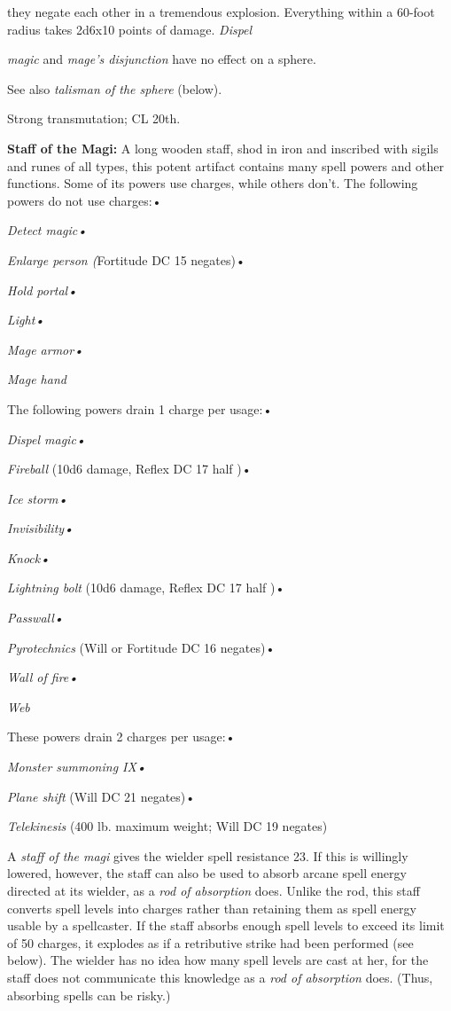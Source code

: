 \documentclass{article}
\begin{document}
they negate each other in a tremendous explosion. Everything within a 60-foot radius 
takes 2d6x10 points of damage. \textit{Dispel}

\textit{magic }and \textit{mage's disjunction }have no effect on a sphere.

See also \textit{talisman of the sphere }(below).

Strong transmutation; CL 20th.

\vspace{12pt}
\textbf{Staff of the Magi:} A long wooden staff, shod in iron and inscribed with 
sigils and runes of all types, this potent artifact contains many spell powers 
and other functions. Some of its powers use charges, while others don't. The following 
powers do not use charges:• 

\textit{Detect magic• }

\textit{Enlarge person (}Fortitude DC 15 negates)• 

\textit{Hold portal• }

\textit{Light• }

\textit{Mage armor• }

\textit{Mage hand}

The following powers drain 1 charge per usage:• 

\textit{Dispel magic• }

\textit{Fireball }(10d6 damage, Reflex DC 17 half )• 

\textit{Ice storm• }

\textit{Invisibility• }

\textit{Knock• }

\textit{Lightning bolt }(10d6 damage, Reflex DC 17 half )• 

\textit{Passwall• }

\textit{Pyrotechnics }(Will or Fortitude DC 16 negates)• 

\textit{Wall of fire• }

\textit{Web}

These powers drain 2 charges per usage:• 

\textit{Monster summoning IX• }

\textit{Plane shift }(Will DC 21 negates)• 

\textit{Telekinesis }(400 lb. maximum weight; Will DC 19 negates)

A \textit{staff of the magi }gives the wielder spell resistance 23. If this is 
willingly lowered, however, the staff can also be used to absorb arcane spell energy 
directed at its wielder, as a \textit{rod of absorption} does. Unlike the rod, 
this staff converts spell levels into charges rather than retaining them as spell 
energy usable by a spellcaster. If the staff absorbs enough spell levels to exceed 
its limit of 50 charges, it explodes as if a retributive strike had been performed 
(see below). The wielder has no idea how many spell levels are cast at her, for 
the staff does not communicate this knowledge as a \textit{rod of absorption }does. 
(Thus, absorbing spells can be risky.)
\end{document}
